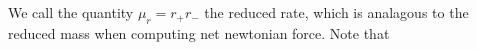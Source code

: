 We call the quantity \(\mu_r = r_+r_-\) the reduced rate, which is analagous to the reduced mass when computing net newtonian force.  Note that